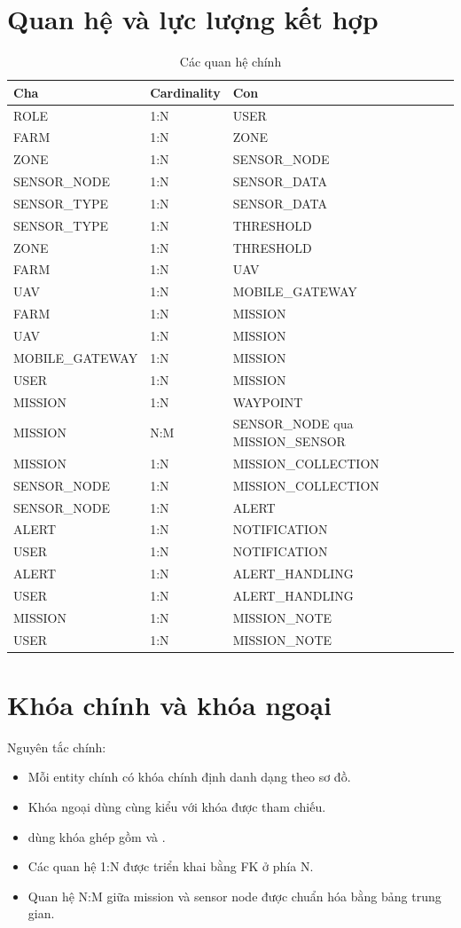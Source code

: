 \section{Quan hệ và lực lượng kết hợp}
\begin{longtable}{p{4cm}p{2cm}p{7cm}}
\caption{Các quan hệ chính}\label{tab:relations}\\
\toprule
Cha & Cardinality & Con \\
\midrule
ROLE & 1:N & USER\\
FARM & 1:N & ZONE\\
ZONE & 1:N & SENSOR\_NODE\\
SENSOR\_NODE & 1:N & SENSOR\_DATA\\
SENSOR\_TYPE & 1:N & SENSOR\_DATA\\
SENSOR\_TYPE & 1:N & THRESHOLD\\
ZONE & 1:N & THRESHOLD\\
FARM & 1:N & UAV\\
UAV & 1:N & MOBILE\_GATEWAY\\
FARM & 1:N & MISSION\\
UAV & 1:N & MISSION\\
MOBILE\_GATEWAY & 1:N & MISSION\\
USER & 1:N & MISSION\\
MISSION & 1:N & WAYPOINT\\
MISSION & N:M & SENSOR\_NODE qua MISSION\_SENSOR\\
MISSION & 1:N & MISSION\_COLLECTION\\
SENSOR\_NODE & 1:N & MISSION\_COLLECTION\\
SENSOR\_NODE & 1:N & ALERT\\
ALERT & 1:N & NOTIFICATION\\
USER & 1:N & NOTIFICATION\\
ALERT & 1:N & ALERT\_HANDLING\\
USER & 1:N & ALERT\_HANDLING\\
MISSION & 1:N & MISSION\_NOTE\\
USER & 1:N & MISSION\_NOTE\\
\bottomrule
\end{longtable}

\section{Khóa chính và khóa ngoại}
Nguyên tắc chính:
\begin{itemize}
  \item Mỗi entity chính có khóa chính định danh dạng  theo sơ đồ.
  \item Khóa ngoại dùng cùng kiểu với khóa được tham chiếu.
  \item {} dùng khóa ghép gồm  và .
  \item Các quan hệ 1:N được triển khai bằng FK ở phía N.
  \item Quan hệ N:M giữa mission và sensor node được chuẩn hóa bằng bảng trung gian.
\end{itemize}

